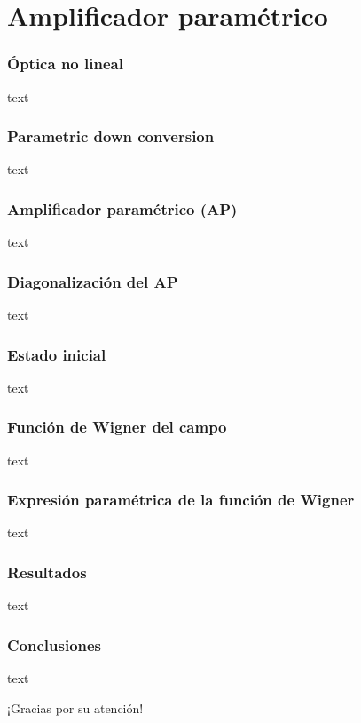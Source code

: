 \documentclass[xcolor=dvipsnames,slidestop,compress,mathserif, 11pt]{beamer}
\begin{document}
\section{Amplificador paramétrico}

\begin{frame}[c]
	\frametitle{Óptica no lineal}
	text
\end{frame}

\begin{frame}[c]
	\frametitle{Parametric down conversion}
	text
\end{frame}

\begin{frame}[c]
	\frametitle{Amplificador paramétrico (AP)}
	text
\end{frame}

\begin{frame}[c]
	\frametitle{Diagonalización del AP}
	text
\end{frame}

\begin{frame}[c]
	\frametitle{Estado inicial}
	text
\end{frame}

\begin{frame}[c]
	\frametitle{Función de Wigner del campo}
	text
\end{frame}

\begin{frame}[c]
	\frametitle{Expresión paramétrica de la función de Wigner}
	text
\end{frame}

\begin{frame}[c]
	\frametitle{Resultados}
	text
\end{frame}

\begin{frame}[c]
	\frametitle{Conclusiones}
	text
\end{frame}

\begin{frame}[c]
	\centering ¡Gracias por su atención!
\end{frame}
\end{document}
